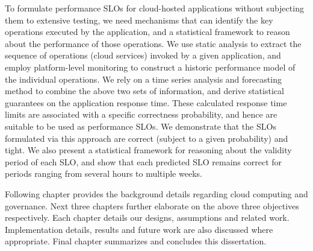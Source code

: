 To formulate performance SLOs for cloud-hosted applications without subjecting them to extensive testing,
we need mechanisms that can identify the key operations executed by the application, and a
statistical framework to reason about the performance of those operations. We use static
analysis to extract the sequence of operations (cloud services) invoked by a given application,
and employ platform-level monitoring to construct a historic performance model of the individual operations.
We rely on a time series analysis and forecasting method to combine the above two sets of information,
and derive statistical guarantees on the application response time. These calculated response time
limits are associated with a specific correctness probability, and hence are suitable to be used
as performance SLOs. We demonstrate that the SLOs formulated via this approach are 
correct (subject to a given probability) and tight. We also present a statistical framework
for reasoning about the validity period of each SLO, and show that each predicted SLO
remains correct for periods ranging from several hours to multiple weeks.

Following chapter provides the background details regarding cloud computing and governance.
Next three chapters further elaborate on the above three objectives respectively. 
Each chapter details our designs, assumptions and related work. Implementation details,
results and future work are also discussed where appropriate. Final chapter
summarizes and concludes this dissertation.